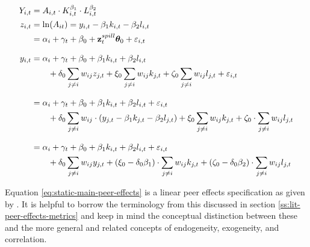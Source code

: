 \begin{align}
    \label{eq:static-production-3-factor}
    Y_{i,t} &= A_{i,t} \cdot
                K_{i,t}^{\beta_1} \cdot
                L_{i,t}^{\beta_2}
    \\
    \label{eq:static-tfp-identity}
    z_{i,t} &= \ln(A_{it}) = y_{i,t} - \beta_1 k_{i,t} - \beta_2 l_{i,t}
    \\
    \label{eq:static-main-reduced}
            &= \alpha_i + \gamma_t + \beta_0 + \mathbf z_t^{spill}\boldsymbol\theta_0 + \varepsilon_{i,t}
    \\[0.8em]
    \label{eq:static-main-gva}
    y_{i,t} &= \alpha_i + \gamma_t + \beta_0
                + \beta_1 k_{i,t}
                + \beta_2 l_{i,t}
                \\ &\qquad \notag
                + \delta_0 \sum_{j\neq i} w_{ij}z_{j,t}
                + \xi_0 \sum_{j\neq i} w_{ij}k_{j,t}
                + \zeta_0 \sum_{j\neq i} w_{ij}l_{j,t}
                + \varepsilon_{i,t}
    \\[0.8em] \notag
            &=
                \alpha_i
                + \gamma_t
                + \beta_0
                + \beta_1 k_{i,t}
                + \beta_2 l_{i,t}
                + \varepsilon_{i,t}
                \\ &\qquad \notag
                + \delta_0 \sum_{j\neq i} w_{ij} \cdot (y_{j,t}
                - \beta_1 k_{j,t}
                - \beta_2 l_{j,t})
                + \xi_0\sum_{j\neq i} w_{ij}k_{j,t}
                + \zeta_0\cdot \sum_{j\neq i} w_{ij}l_{j,t}
    \\[0.8em]
    \label{eq:static-main-peer-effects}
            &=
                \alpha_i
                + \gamma_t
                + \beta_0
                + \beta_1 k_{i,t}
                + \beta_2 l_{i,t}
                + \varepsilon_{i,t}
                \\ &\qquad \notag
                + \delta_0 \sum_{j\neq i} w_{ij}y_{j,t}
                + (\xi_0-\delta_0\beta_1) \cdot \sum_{j\neq i} w_{ij}k_{j,t}
                + (\zeta_0-\delta_0\beta_2) \cdot \sum_{j\neq i} w_{ij}l_{j,t}  
\end{align}
\par
Equation \eqref{eq:static-main-peer-effects} is a linear peer effects specification as given by \cite{Manski1993}.
It is helpful to borrow the terminology from this discussed in section \ref{ss:lit-peer-effects-metrics}
and keep in mind the conceptual distinction between these
and the more general and related concepts of endogeneity, exogeneity, and correlation.
